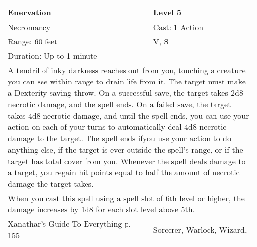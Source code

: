 \documentclass[11pt]{report}
\begin{document}
\begin{table}[H]
	\begin{tabular}{||p{6cm}|p{6cm}||}
		\hline\hline
		\bf{Enervation} & Level 5\\ \hline
		Necromancy & Cast: 1 Action\\ \hline
		Range: 60 feet & V, S\\ \hline
		Duration: Up to 1 minute & \\ \hline
		\multicolumn{2}{||p{12cm}||}{A tendril of inky darkness reaches out from you, touching a creature you can see within range to drain life from it. The target must make a Dexterity saving throw. On a successful save, the target takes 2d8 necrotic damage, and the spell ends. On a failed save, the target takes 4d8 necrotic damage, and until the spell ends, you can use your action on each of your turns to automatically deal 4d8 necrotic damage to the target. The spell ends ifyou use your action to do anything else, if the target is ever outside the spell’s range, or if the target has total cover from you. Whenever the spell deals damage to a target, you regain hit points equal to half the amount of necrotic damage the target takes.}\\ \hline
		\multicolumn{2}{||p{12cm}||}{When you cast this spell using a spell slot of 6th level or higher, the damage increases by 1d8 for each slot level above 5th.}\\ \hline
Xanathar's Guide To Everything p. 155 & Sorcerer, Warlock, Wizard, \\ \hline\hline
	\end{tabular}
\end{table}
\end{document}
